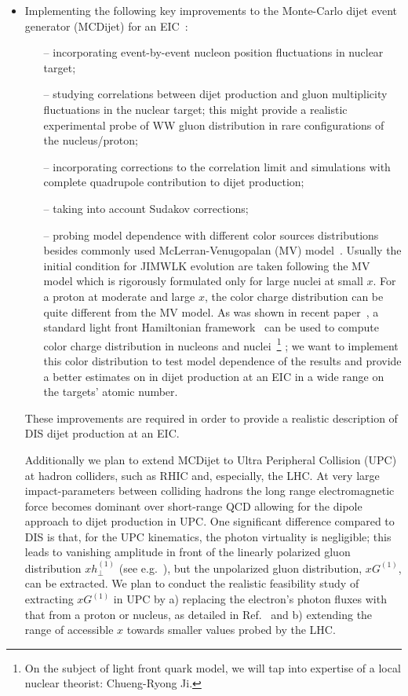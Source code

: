\begin{itemize}
			\item 
				Implementing the following key improvements to the Monte-Carlo dijet event generator (MCDijet) 
				for an EIC~\cite{TODO}:
				\begin{itemize}
					\item[--] incorporating event-by-event nucleon position fluctuations in nuclear target; 
					\item[--] studying correlations between dijet production and gluon multiplicity fluctuations 
						in the nuclear target; this might provide a realistic experimental probe 
						of WW gluon distribution in rare configurations of the nucleus/proton;
					\item[--] incorporating corrections to the correlation limit and simulations with complete 
						quad\-rupole contribution to dijet production; 
					\item[--] taking into account Sudakov corrections;  
					\item[--] probing model dependence with different color sources distributions 
						besides commonly used McLerran-Venugopalan (MV) model~\cite{McLerran:1993ni}. 
						Usually the initial condition for JIM\-WLK evolution are taken following 
						the MV model which is rigorously formulated only for large nuclei at 
						small $x$. For a proton at moderate and large $x$, the color charge 
						distribution can be quite different from the MV model. 
						As was shown in recent paper~\cite{Dumitru:2018vpr}, a
						standard light front Hamiltonian framework~\cite{Brodsky:1997de} can be used to compute color charge 
						distribution in nucleons and nuclei~\footnote{On the subject of light front quark model, 
							we will tap into expertise of a local nuclear theorist: Chueng-Ryong Ji.}  		
							; we want to implement this color distribution 
						to test model dependence of the results and provide a better estimates on 
						in dijet production at an EIC in a wide range on the targets' atomic number.    
				\end{itemize}
				These improvements are required in order to provide a realistic description of DIS
				dijet production at an EIC. 

				Additionally we plan to extend MCDijet to Ultra Peripheral Collision  (UPC) at hadron 
				colliders, such as RHIC and, especially, the LHC. 
				At very large impact-parameters between colliding hadrons the long range electromagnetic
				force becomes dominant over short-range QCD allowing for the dipole approach to 
				dijet production in UPC. One significant difference compared to DIS is that, for
				the UPC kinematics, the photon virtuality  is negligible; 
				this leads to vanishing amplitude in front of the linearly polarized gluon 
				distribution $x h^{(1)}_\perp$ (see e.g.~\cite{Dominguez:2011br}), 
				but the unpolarized gluon distribution, $xG^{(1)}$,  can be extracted. 
				We plan to conduct the realistic feasibility study of extracting  $xG^{(1)}$ in UPC 
				by 
				a) replacing the electron's photon fluxes with that from a proton or nucleus, as detailed in 
				Ref.~\cite{Klein:1999gv}
				and b) extending the range of accessible $x$ towards smaller values probed by  the LHC. 


\end{itemize}
